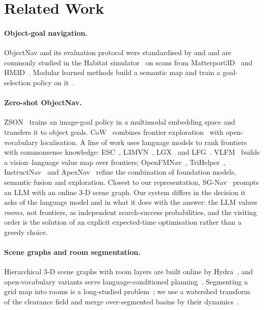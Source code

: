 \documentclass[10pt]{article}
\begin{document}
\section{Related Work}\label{sec:related}

\paragraph{Object-goal navigation.} ObjectNav and its evaluation protocol were
standardised by \citet{anderson2018evaluation} and \citet{batra2020objectnav}
and are commonly studied in the Habitat
simulator~\citep{savva2019habitat,szot2021habitat} on scans from
Matterport3D~\citep{chang2017matterport3d} and
HM3D~\citep{ramakrishnan2021habitat,yadav2023habitat}. Modular learned methods
build a semantic map and train a goal-selection policy on
it~\citep{chaplot2020object,ramakrishnan2022poni}.

\paragraph{Zero-shot ObjectNav.} ZSON~\citep{majumdar2022zson} trains an
image-goal policy in a multimodal embedding space and transfers it to object
goals. CoW~\citep{gadre2023cows} combines frontier
exploration~\citep{yamauchi1997frontier} with open-vocabulary localisation.
A line of work uses language models to rank frontiers with commonsense
knowledge: ESC~\citep{zhou2023esc}, L3MVN~\citep{yu2023l3mvn},
LGX~\citep{dorbala2024can} and LFG~\citep{shah2023navigation}.
VLFM~\citep{yokoyama2024vlfm} builds a vision--language value map over
frontiers; OpenFMNav~\citep{kuang2024openfmnav},
TriHelper~\citep{zhang2024trihelper}, InstructNav~\citep{long2024instructnav}
and ApexNav~\citep{zhang2025apexnav} refine the combination of foundation
models, semantic fusion and exploration. Closest to our representation,
SG-Nav~\citep{yin2024sg} prompts an LLM with an online 3-D scene graph. Our
system differs in the decision it asks of the language model and in what it
does with the answer: the LLM values \emph{rooms}, not frontiers, as independent
search-success probabilities, and the visiting order is the solution of an
explicit expected-time optimisation rather than a greedy choice.

\paragraph{Scene graphs and room segmentation.} Hierarchical 3-D scene graphs
with room layers are built online by Hydra~\citep{hughes2022hydra}, and
open-vocabulary variants serve language-conditioned
planning~\citep{gu2024conceptgraphs,werby2024hierarchical}. Segmenting a grid
map into rooms is a long-studied problem~\citep{bormann2016room}; we use a
watershed transform~\citep{vincent1991watersheds} of the clearance field and
merge over-segmented basins by their dynamics~\citep{grimaud1992new}.
\end{document}
